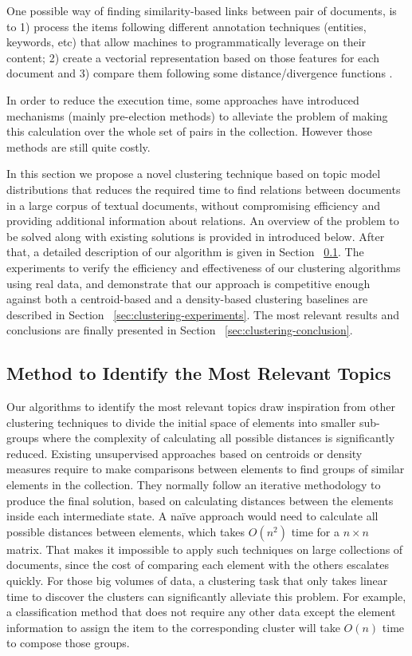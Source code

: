 One possible way of finding similarity-based links between pair of documents, is to 1) process the items following different annotation techniques (entities, keywords, etc) that allow machines to programmatically leverage on their content; 2) create a vectorial representation based on those features for each document and 3) compare them following some distance/divergence functions \citep{Kenter2015}.

In order to reduce the execution time, some approaches have introduced mechanisms (mainly pre-election methods) to alleviate the problem of making this calculation over the whole set of pairs in the collection. However those methods are still quite costly.

In this section we propose a novel clustering technique based on topic model distributions that reduces the required time to find relations between documents in a large corpus of textual documents, without compromising efficiency and providing additional information about relations. An overview of the problem to be solved along with existing solutions is provided in introduced below. After that, a detailed description of our algorithm is given in Section ~\ref{sec:clustering-approach}. The experiments to verify the efficiency and effectiveness of our clustering algorithms using real data, and demonstrate that our approach is competitive enough against both a centroid-based and a density-based clustering baselines are described in Section ~\ref{sec:clustering-experiments}. The most relevant results and conclusions are finally presented in Section ~\ref{sec:clustering-conclusion}.

\subsection{Method to Identify the Most Relevant Topics}
\label{sec:clustering-approach}

Our algorithms to identify the most relevant topics draw inspiration from other clustering techniques to divide the initial space of elements into smaller sub-groups where the complexity of calculating all possible distances is significantly reduced. Existing unsupervised approaches based on centroids or density measures require to make comparisons between elements to find groups of similar elements in the collection. They normally follow an iterative methodology to produce the final solution, based on calculating distances between the elements inside each intermediate state. A na{\"i}ve approach would need to calculate all possible distances between elements, which takes $O(n^2)$ time for a $n \times n$ matrix. That makes it impossible to apply such techniques on large collections of documents, since the cost of comparing each element with the others escalates quickly. For those big volumes of data, a clustering task that only takes linear time to discover the clusters can significantly alleviate this problem. For example, a classification method that does not require any other data except the element information to assign the item to the corresponding cluster will take $O(n)$ time to compose those groups.

